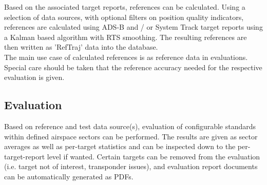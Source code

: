 Based on the associated target reports, references can be calculated. Using a selection of data sources, with optional filters on position quality indicators, references are calculated using ADS-B and / or System Track target reports using a Kalman based algorithm with RTS smoothing. The resulting references are then written as 'RefTraj' data into the database. \\

The main use case of calculated references is as reference data in evaluations. Special care should be taken that the reference accuracy needed for the respective evaluation is given.

\subsection*{Evaluation}

Based on reference and test data source(s), evaluation of configurable standards within defined airspace sectors can be performed. The results are given as sector averages as well as per-target statistics and can be inspected down to the per-target-report level if wanted. Certain targets can be removed from the evaluation (i.e. target not of interest, transponder issues), and evaluation report documents can be automatically generated as PDFs.
